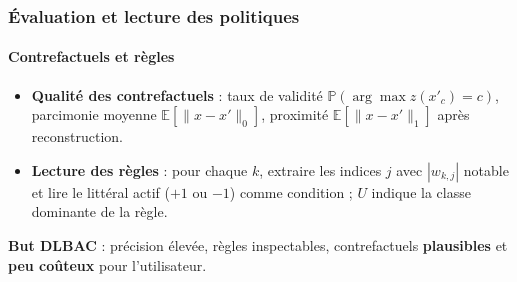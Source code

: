 \documentclass{beamer}
\begin{document}
\begin{frame}
\frametitle{Évaluation et lecture des politiques}
\framesubtitle{Contrefactuels et règles}

\begin{itemize}
    \item \textbf{Qualité des contrefactuels} : taux de validité $\mathbb{P}(\arg\max z(x'_c) = c)$, parcimonie moyenne $\mathbb{E}[\|x - x'\|_0]$, proximité $\mathbb{E}[\|x - x'\|_1]$ après reconstruction.
    \item \textbf{Lecture des règles} : pour chaque $k$, extraire les indices $j$ avec $|w_{k,j}|$ notable et lire le littéral actif ($+1$ ou $-1$) comme condition ; $U$ indique la classe dominante de la règle.
\end{itemize}

\vspace{0.4cm}
\begin{center}
\textbf{But DLBAC} : précision élevée, règles inspectables, contrefactuels \textbf{plausibles} et \textbf{peu coûteux} pour l'utilisateur.
\end{center}

\end{frame}
\end{document}

